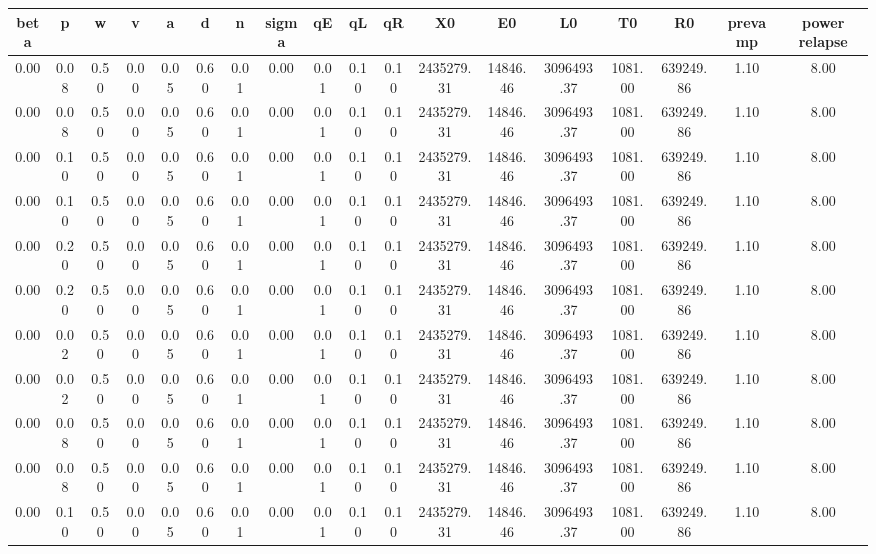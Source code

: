 \begin{tiny}\begin{tabular}{|c|c|c|c|c|c|c|c|c|c|c|c|c|c|c|c|c|c|}
\hline
\textbf{beta}&\textbf{p}&\textbf{w}&\textbf{v}&\textbf{a}&\textbf{d}&\textbf{n}&\textbf{sigma}&\textbf{qE}&\textbf{qL}&\textbf{qR}&\textbf{X0}&\textbf{E0}&\textbf{L0}&\textbf{T0}&\textbf{R0}&\textbf{prevamp}&\textbf{power relapse}\\\hline
0.00&0.08&0.50&0.00&0.05&0.60&0.01&0.00&0.01&0.10&0.10&2435279.31&14846.46&3096493.37&1081.00&639249.86&1.10&8.00\\\hline
0.00&0.08&0.50&0.00&0.05&0.60&0.01&0.00&0.01&0.10&0.10&2435279.31&14846.46&3096493.37&1081.00&639249.86&1.10&8.00\\\hline
0.00&0.10&0.50&0.00&0.05&0.60&0.01&0.00&0.01&0.10&0.10&2435279.31&14846.46&3096493.37&1081.00&639249.86&1.10&8.00\\\hline
0.00&0.10&0.50&0.00&0.05&0.60&0.01&0.00&0.01&0.10&0.10&2435279.31&14846.46&3096493.37&1081.00&639249.86&1.10&8.00\\\hline
0.00&0.20&0.50&0.00&0.05&0.60&0.01&0.00&0.01&0.10&0.10&2435279.31&14846.46&3096493.37&1081.00&639249.86&1.10&8.00\\\hline
0.00&0.20&0.50&0.00&0.05&0.60&0.01&0.00&0.01&0.10&0.10&2435279.31&14846.46&3096493.37&1081.00&639249.86&1.10&8.00\\\hline
0.00&0.02&0.50&0.00&0.05&0.60&0.01&0.00&0.01&0.10&0.10&2435279.31&14846.46&3096493.37&1081.00&639249.86&1.10&8.00\\\hline
0.00&0.02&0.50&0.00&0.05&0.60&0.01&0.00&0.01&0.10&0.10&2435279.31&14846.46&3096493.37&1081.00&639249.86&1.10&8.00\\\hline
0.00&0.08&0.50&0.00&0.05&0.60&0.01&0.00&0.01&0.10&0.10&2435279.31&14846.46&3096493.37&1081.00&639249.86&1.10&8.00\\\hline
0.00&0.08&0.50&0.00&0.05&0.60&0.01&0.00&0.01&0.10&0.10&2435279.31&14846.46&3096493.37&1081.00&639249.86&1.10&8.00\\\hline
0.00&0.10&0.50&0.00&0.05&0.60&0.01&0.00&0.01&0.10&0.10&2435279.31&14846.46&3096493.37&1081.00&639249.86&1.10&8.00\\\hline
\end{tabular}
\end{tiny}